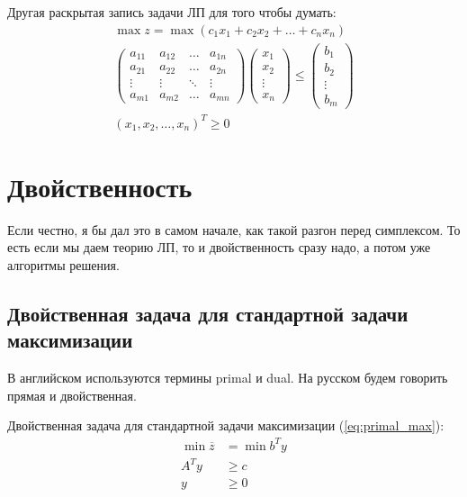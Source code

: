 \documentclass[a4paper,article,14pt]{extarticle}
\begin{document}
Другая раскрытая запись задачи ЛП для того чтобы думать:
\begin{equation}
    \begin{gathered}
        \max z = \max (c_1x_1 + c_2x_2 + \ldots + c_nx_n) \\
        \begin{pmatrix}
            a_{11} & a_{12} & \ldots & a_{1n} \\
            a_{21} & a_{22} & \ldots & a_{2n} \\
            \vdots & \vdots & \ddots & \vdots \\
            a_{m1} & a_{m2} & \ldots & a_{mn}
        \end{pmatrix}
        \begin{pmatrix}
            x_1 \\ x_2 \\ \vdots \\ x_n
        \end{pmatrix}
        \le
        \begin{pmatrix}
            b_1 \\ b_2 \\ \vdots \\ b_m
        \end{pmatrix}
        \\
        (x_1, x_2, \ldots, x_n)^T \ge 0
    \end{gathered}
\end{equation}

\section{Двойственность}

Если честно, я бы дал это в самом начале, как такой разгон перед симплексом.
То есть если мы даем теорию ЛП, то и двойственность сразу надо, а потом уже алгоритмы решения.

\subsection{Двойственная задача для стандартной задачи максимизации}

В английском используются термины primal и dual.
На русском будем говорить прямая и двойственная.

Двойственная задача для стандартной задачи максимизации (\ref{eq:primal_max}):
\begin{equation} \label{dual_max}
    \begin{aligned}
        \min \overline z & = \min b^Ty \\
        A^Ty & \ge c \\
        y & \ge 0
    \end{aligned}
\end{equation}
\end{document}
